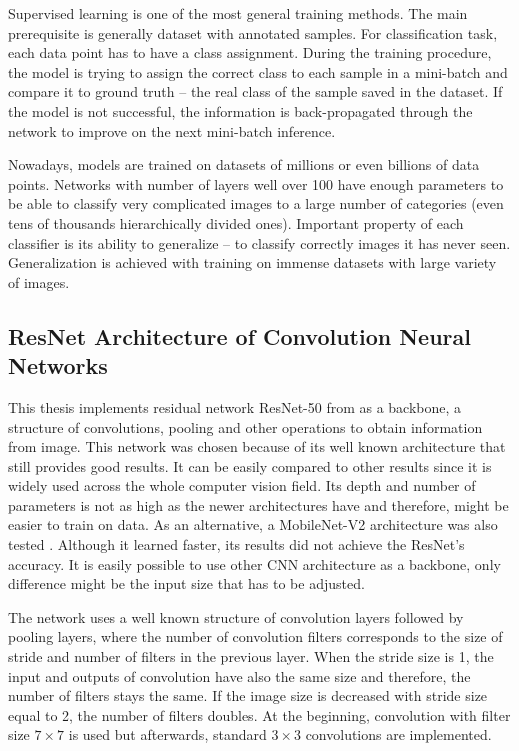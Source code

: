 Supervised learning is one of the most general training methods. The main prerequisite is generally dataset with annotated samples. For classification task, each data point has to have a class assignment. During the training procedure, the model is trying to assign the correct class to each sample in a mini-batch and compare it to ground truth -- the real class of the sample saved in the dataset. If the model is not successful, the information is back-propagated through the network to improve on the next mini-batch inference.

Nowadays, models are trained on datasets of millions or even billions of data points. Networks with number of layers well over 100 have enough parameters to be able to classify very complicated images to a large number of categories (even tens of thousands hierarchically divided ones). Important property of each classifier is its ability to generalize -- to classify correctly images it has never seen. Generalization is achieved with training on immense datasets with large variety of images.

\subsection{ResNet Architecture of Convolution Neural Networks}

This thesis implements residual network ResNet-50 from \cite{he2015deep-resnet} as a backbone, a structure of convolutions, pooling and other operations to obtain information from image. This network was chosen because of its well known architecture that still provides good results. It can be easily compared to other results since it is widely used across the whole computer vision field. Its depth and number of parameters is not as high as the newer architectures have and therefore, might be easier to train on data. As an alternative, a MobileNet-V2 architecture was also tested \cite{mobilenetv2}. Although it learned faster, its results did not achieve the ResNet's accuracy. It is easily possible to use other CNN architecture as a backbone, only difference might be the input size that has to be adjusted.

The network uses a well known structure of convolution layers followed by pooling layers, where the number of convolution filters corresponds to the size of stride and number of filters in the previous layer. When the stride size is 1, the input and outputs of convolution have also the same size and therefore, the number of filters stays the same. If the image size is decreased with stride size equal to 2, the number of filters doubles. At the beginning, convolution with filter size $7 \times 7$ is used but afterwards, standard $3 \times 3$ convolutions are implemented.

